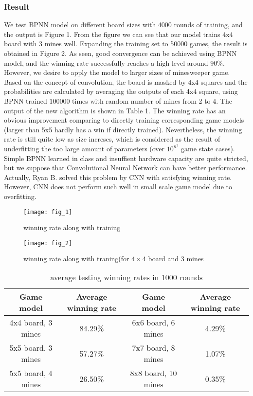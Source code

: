 \documentclass{article}
\begin{document}
\subsubsection{Result}
We test BPNN model on different board sizes with 4000 rounds of training, and the output is Figure 1. From the figure we can see that our model trains 4x4 board with 3 mines well. Expanding the training set to 50000 games, the result is obtained in Figure 2. As seen, good convergence can be achieved using BPNN model, and the winning rate successfully reaches a high level around 90$\%$. However, we desire to apply the model to larger sizes of minesweeper game. Based on the concept of convolution, the board is masked by 4x4 squares and the probabilities are calculated by averaging the outputs of each 4x4 square, using BPNN trained 100000 times with random number of mines from 2 to 4. The output of the new algorithm is shown in Table 1. The winning rate has an obvious improvement comparing to directly training corresponding game models (larger than 5x5 hardly has a win if directly trained). Nevertheless, the winning rate is still quite low as size increses, which is considered as the result of underfitting the too large amount of parameters (over $10^{n^2}$ game state cases). Simple BPNN learned in class and insuffient hardware capacity are quite stricted, but we suppose that Convolutional Neural Network can have better performance. Actually, Ryan B. solved this problem by CNN with satisfying winning rate. However, CNN does not perform such well in small scale game model due to overfitting.
\begin{figure}
	\begin{minipage}[t]{0.5\linewidth}  	
		\centering  	
		\texttt{[image: fig\_1]}
		\caption{winning rate along with training}  	
	\end{minipage}%
	\hfill  
	\begin{minipage}[t]{0.5\linewidth}  	
		\centering  	
		\texttt{[image: fig\_2]}  	
		\caption{winning rate along with traning(for $4\times4$ board and 3 mines}  	
	\end{minipage}
\end{figure}
\begin{table}
	\caption{average testing winning rates in 1000 rounds}
	\label{testing winning}
	\centering
	\begin{tabular}{cccc}
		\toprule
		Game model   & Average winning rate & Game model   & Average winning rate\\
		\midrule
		4x4 board, 3 mines & 84.29\%  & 6x6 board, 6 mines  &  4.29\%     \\
		5x5 board, 3 mines & 57.27\%  & 7x7 board, 8 mines  &  1.07\%    \\
		5x5 board, 4 mines & 26.50\%  & 8x8 board, 10 mines &  0.35\%    \\
		\bottomrule
	\end{tabular}
\end{table}
\end{document}
